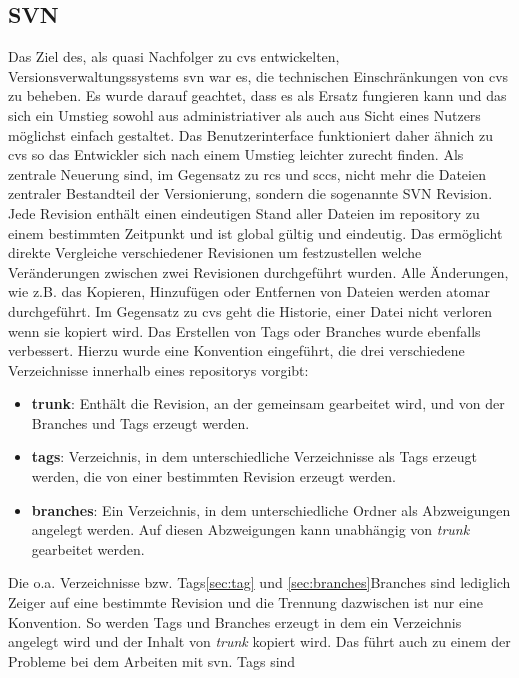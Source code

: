 \subsection{SVN}\label{sec:svn}
Das Ziel des, als quasi Nachfolger zu \acrshort{cvs} entwickelten,
Versionsverwaltungssystems \acrfull{svn} war es, die technischen
Einschränkungen von \acrshort{cvs} zu beheben. Es wurde darauf geachtet, dass
es als Ersatz fungieren kann und das sich ein Umstieg sowohl aus
administriativer als auch aus Sicht eines Nutzers möglichst einfach gestaltet.
Das Benutzerinterface funktioniert daher ähnich zu \acrshort{cvs} so das
Entwickler sich nach einem Umstieg leichter zurecht finden. Als zentrale
Neuerung sind, im Gegensatz zu \acrshort{rcs} und \acrshort{sccs}, nicht mehr
die Dateien zentraler Bestandteil der Versionierung, sondern die sogenannte SVN
Revision. Jede Revision enthält einen eindeutigen Stand aller Dateien im
\gls{repository} zu einem bestimmten Zeitpunkt und ist global gültig und
eindeutig. Das ermöglicht direkte Vergleiche verschiedener Revisionen um
festzustellen welche Veränderungen zwischen zwei Revisionen durchgeführt
wurden. Alle Änderungen, wie z.B. das Kopieren, Hinzufügen oder Entfernen von
Dateien werden atomar durchgeführt. Im Gegensatz zu \acrshort{cvs} geht die
Historie, einer Datei nicht verloren wenn sie kopiert wird. Das Erstellen von
Tags oder Branches wurde ebenfalls verbessert. Hierzu wurde eine Konvention
eingeführt, die drei verschiedene Verzeichnisse innerhalb eines
\glspl{repository} vorgibt:
\begin{itemize}
\item \textbf{trunk}: Enthält die Revision, an der gemeinsam gearbeitet wird,
       und von der Branches und Tags erzeugt werden.
\item \textbf{tags}: Verzeichnis, in dem unterschiedliche Verzeichnisse als
       Tags erzeugt werden, die von einer bestimmten Revision erzeugt werden.
\item \textbf{branches}: Ein Verzeichnis, in dem unterschiedliche Ordner als
      Abzweigungen angelegt werden. Auf diesen Abzweigungen kann unabhängig von
      \textit{trunk} gearbeitet werden.
\end{itemize}
Die o.a. Verzeichnisse bzw. Tags\ref{sec:tag} und \ref{sec:branches}Branches
sind lediglich Zeiger auf eine bestimmte Revision und die Trennung dazwischen
ist nur eine Konvention. So werden Tags und Branches erzeugt in dem ein
Verzeichnis angelegt wird und der Inhalt von \textit{trunk} kopiert wird. Das
führt auch zu einem der Probleme bei dem Arbeiten mit \acrlong{svn}. Tags sind

